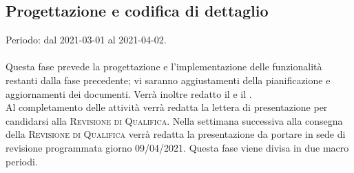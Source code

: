\documentclass[../piano_di_progetto.tex]{subfiles}
\begin{document}
\subsection{Progettazione e codifica di dettaglio}%
\label{sub:prog_dett}
Periodo: dal 2021-03-01 al 2021-04-02.\\ \\
Questa fase prevede la progettazione e l'implementazione delle funzionalità restanti dalla fase precedente; vi saranno aggiustamenti della pianificazione e aggiornamenti dei documenti. Verrà inoltre redatto il \textsc{} e il \textsc{}. \\
Al completamento delle attività verrà redatta la lettera di presentazione per candidarsi alla \textsc{Revisione di Qualifica}. 
Nella settimana successiva alla consegna della \textsc{Revisione di Qualifica} verrà redatta la presentazione da portare in sede di revisione programmata giorno 09/04/2021. 
Questa fase viene divisa in due macro periodi.



\end{document}
